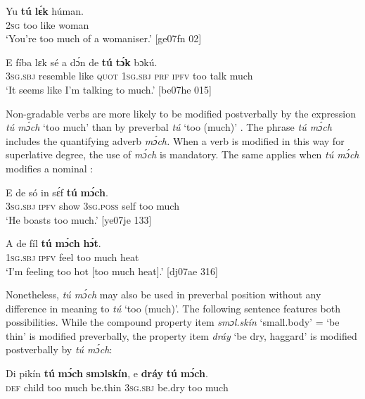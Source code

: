 \ea%
    \label{ex:key:859}
    \gll Yu  \textbf{tú}  \textbf{lɛ́k}  húman.\\
\textsc{2sg}  too  like  woman\\

\glt ‘You’re too much of a womaniser.’ [ge07fn 02]
\z


\ea%
    \label{ex:key:860}
    \gll E    fíba    lɛk  sé    a    dɔ́n  de  \textbf{tú}  \textbf{tɔ́k}  bɔkú.\\
\textsc{3sg.sbj}  resemble  like  \textsc{quot}    \textsc{1sg.sbj}  \textsc{prf}  \textsc{ipfv}  too  talk  much\\

\glt ‘It seems like I’m talking to much.’ [be07he 015]
\z

Non-gradable verbs are more likely to be modified postverbally by the expression \textit{tú mɔ́ch} ‘too much’ than by preverbal \textit{tú} ‘too (much)’ . The phrase \textit{tú mɔ́ch} includes the quantifying adverb \textit{mɔ́ch.} When a verb is modified in this way for superlative degree, the use of \textit{mɔ́ch} is mandatory. The same applies when \textit{tú mɔ́ch} modifies a nominal :


\ea%
    \label{ex:key:861}
    \gll E    de  só    in    sɛ́f  \textbf{tú}  \textbf{mɔ́ch}.\\
\textsc{3sg.sbj}  \textsc{ipfv}  show  \textsc{3sg.poss}  self  too  much\\

\glt ‘He boasts too much.’ [ye07je 133]
\z


\ea%
    \label{ex:key:862}
    \gll A    de  fíl  \textbf{tú}  \textbf{mɔ́ch}  \textbf{hɔ́t}.\\
\textsc{1sg.sbj}  \textsc{ipfv}  feel  too  much  heat\\

\glt ‘I’m feeling too hot [too much heat].’ [dj07ae 316]
\z

Nonetheless, \textit{tú mɔ́ch} may also be used in preverbal position without any difference in meaning to \textit{tú} ‘too (much)’. The following sentence features both possibilities. While the compound property item \textit{smɔl.skín} ‘small.body’ = ‘be thin’ is modified preverbally, the property item \textit{dráy} ‘be dry, haggard’ is modified postverbally by \textit{tú mɔ́ch}: 


\ea%
    \label{ex:key:863}
    \gll Di  pikín  \textbf{tú}  \textbf{mɔ́ch}  \textbf{smɔlskín},  e    \textbf{dráy}  \textbf{tú}  \textbf{mɔ́ch}.\\
\textsc{def}  child  too  much  be.thin    \textsc{3sg.sbj}  be.dry  too  much\\

